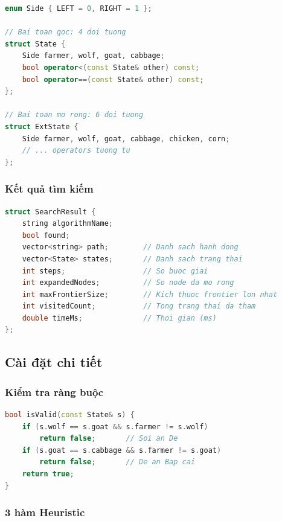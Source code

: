 \documentclass[a4paper,12pt]{article}
\begin{document}
\begin{lstlisting}[language=C++, caption={Biểu diễn trạng thái bài toán gốc và mở rộng}]
enum Side { LEFT = 0, RIGHT = 1 };

// Bai toan goc: 4 doi tuong
struct State {
    Side farmer, wolf, goat, cabbage;
    bool operator<(const State& other) const;
    bool operator==(const State& other) const;
};

// Bai toan mo rong: 6 doi tuong
struct ExtState {
    Side farmer, wolf, goat, cabbage, chicken, corn;
    // ... operators tuong tu
};
\end{lstlisting}

\subsubsection{Kết quả tìm kiếm}

\begin{lstlisting}[language=C++, caption={Cấu trúc kết quả tìm kiếm}]
struct SearchResult {
    string algorithmName;
    bool found;
    vector<string> path;        // Danh sach hanh dong
    vector<State> states;       // Danh sach trang thai
    int steps;                  // So buoc giai
    int expandedNodes;          // So node da mo rong
    int maxFrontierSize;        // Kich thuoc frontier lon nhat
    int visitedCount;           // Tong trang thai da tham
    double timeMs;              // Thoi gian (ms)
};
\end{lstlisting}

\subsection{Cài đặt chi tiết}

\subsubsection{Kiểm tra ràng buộc}

\begin{lstlisting}[language=C++, caption={Hàm kiểm tra trạng thái hợp lệ}]
bool isValid(const State& s) {
    if (s.wolf == s.goat && s.farmer != s.wolf)
        return false;       // Soi an De
    if (s.goat == s.cabbage && s.farmer != s.goat)
        return false;       // De an Bap cai
    return true;
}
\end{lstlisting}

\subsubsection{3 hàm Heuristic}
\end{document}
